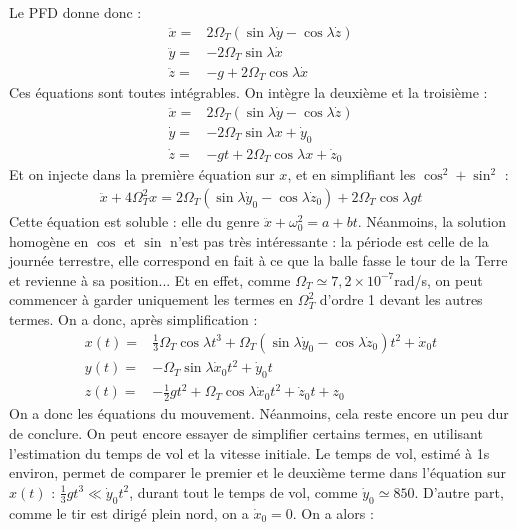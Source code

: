\begin{correction}
Le PFD donne donc :
	\begin{align*}
        \ddot{x}=&2\Omega_T(\sin\lambda\dot{y}-\cos\lambda\dot{z})\\ 
        \ddot{y}=&-2\Omega_T\sin\lambda\dot{x} \\
        \ddot{z}=&-g+2\Omega_T\cos\lambda\dot{x}
	\end{align*}
Ces équations sont toutes intégrables. On intègre la deuxième et la troisième :
	\begin{align*}
        \ddot{x}=&2\Omega_T(\sin\lambda\dot{y}-\cos\lambda\dot{z})\\ 
        \dot{y}=&-2\Omega_T\sin\lambda x + \dot{y}_0 \\
        \dot{z}=&-gt+2\Omega_T\cos\lambda x + \dot{z}_0
	\end{align*}
Et on injecte dans la première équation sur $x$, et en simplifiant les $\cos^2+\sin^2$ : 
\begin{align*}
	\ddot{x}+4\Omega_T^2x=2\Omega_T(\sin\lambda\dot{y}_0-\cos\lambda\dot{z}_0)+2\Omega_T\cos\lambda gt
\end{align*}
	Cette équation est soluble : elle du genre $\ddot{x}+\omega_0^2=a+bt$. Néanmoins, la solution homogène en $\cos$ et $\sin$ n'est pas très intéressante : la période est celle de la journée terrestre, elle correspond en fait à ce que la balle fasse le tour de la Terre et revienne à sa position... Et en effet, comme $\Omega_T\simeq7,2\times10^{-7}$rad/s, on peut commencer à garder uniquement les termes en $\Omega_T^2$ d'ordre 1 devant les autres termes. On a donc, après simplification :
	\begin{align*}
        x(t)=& \frac{1}{3}\Omega_T\cos\lambda t^3+\Omega_T(\sin\lambda\dot{y}_0-\cos\lambda\dot{z}_0)t^2+\dot{x}_0t\\ 
        y(t)=&-\Omega_T\sin\lambda \dot{x}_0t^2 + \dot{y}_0t \\
        z(t)=&-\frac{1}{2} gt^2+\Omega_T\cos\lambda \dot{x}_0t^2 + \dot{z}_0t+z_0
	\end{align*}	
On a donc les équations du mouvement. Néanmoins, cela reste encore un peu dur de conclure. On peut encore essayer de simplifier certains termes, en utilisant l'estimation du temps de vol et la vitesse initiale. Le temps de vol, estimé à 1s environ, permet de comparer le premier et le deuxième terme dans l'équation sur $x(t)$ : $\frac{1}{3}gt^3\ll\dot{y}_0t^2$, durant tout le temps de vol, comme $\dot{y}_0\simeq 850$. D'autre part, comme le tir est dirigé plein nord, on a $\dot{x}_0=0$. On a alors :
	\begin{align*}

\end{align*}
\end{correction}

